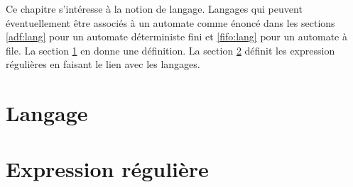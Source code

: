 Ce chapitre s'intéresse à la notion de langage. Langages qui peuvent éventuellement être associés à un automate comme énoncé dans les sections \ref{adf:lang} pour un automate déterministe fini et \ref{fifo:lang} pour un automate à file. La section \ref{lr:def} en donne une définition. La section \ref{lr:regex} définit les expression régulières en faisant le lien avec les langages.

\section{Langage}\label{lr:def}
\section{Expression régulière}\label{lr:regex}
